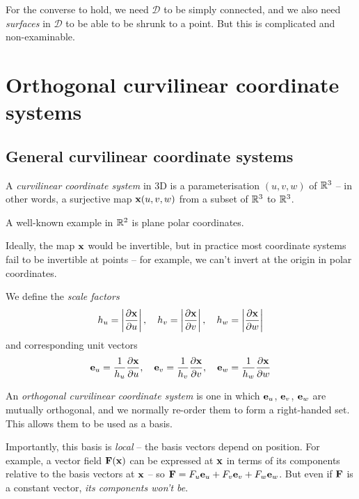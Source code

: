 \documentclass{../../template/note}
\begin{document}
    \begin{remark*}
        For the converse to hold, we need \(\mathscr D\) to be simply connected, and we also need \emph{surfaces} in \(\mathscr D\) to be able to be shrunk to a point. But this is complicated and non-examinable.
    \end{remark*}
    
    \section{Orthogonal curvilinear coordinate systems}

    \subsection{General curvilinear coordinate systems}

    \begin{definition*}
        A \emph{curvilinear coordinate system} in 3D is a parameterisation \((u, v, w)\) of \(\mathbb R^3\) -- in other words, a surjective map \(\V x(u, v, w)\) from a subset of \(\mathbb R^3\) to \(\mathbb R^3\).
    \end{definition*}
    
    A well-known example in \(\mathbb R^2\) is plane polar coordinates.

    \begin{remark*}
        Ideally, the map \(\V x\) would be invertible, but in practice most coordinate systems fail to be invertible at points -- for example, we can't invert at the origin in polar coordinates.
    \end{remark*}
    We define the \emph{scale factors}
    \begin{align*}
        h_u = \left|\pd{\V x}{u}\right|,\quad h_v = \left|\pd{\V x}{v}\right|,\quad h_w = \left|\pd{\V x}{w}\right|
    \end{align*}
    and corresponding unit vectors
    \begin{align*}
        \V e_u = \frac 1{h_u} \pd{\V x}{u}, \quad \V e_v = \frac 1{h_v} \pd{\V x}{v}, \quad \V e_w = \frac 1{h_w} \pd{\V x}{w}
    \end{align*}
    \begin{definition*}
        An \emph{orthogonal curvilinear coordinate system} is one in which \(\V e_u\), \(\V e_v\), \(\V e_w\) are mutually orthogonal, and we normally re-order them to form a right-handed set. This allows them to be used as a basis.
    \end{definition*}
    Importantly, this basis is \emph{local} -- the basis vectors depend on position. For example, a vector field \(\V F(\V x)\) can be expressed at \(\V x\) in terms of its components relative to the basis vectors at \(\V x\) -- so \(\V F = F_u \V e_u + F_v \V e_v + F_w \V e_w\). But even if \(\V F\) is a constant vector, \emph{its components won't be}.
    
\end{document}
